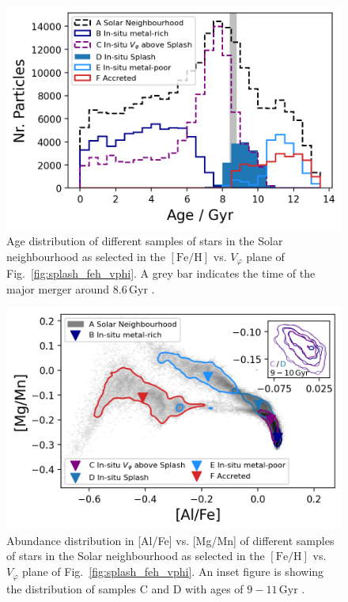 \documentclass[fleqn,usenatbib]{mnras}
\begin{document}
\begin{figure}
    \centering
    \includegraphics[width=0.9\columnwidth]{figures/splash_age.png}
    \caption{Age distribution of different samples of stars in the Solar neighbourhood as selected in the $\mathrm{[Fe/H]}$ vs. $V_\varphi$ plane of Fig.~\ref{fig:splash_feh_vphi}. A grey bar indicates the time of the major merger around $8.6\,\mathrm{Gyr}$ \href{https://github.com/svenbuder/gse_nihaouhd/tree/main/figures}{\faGithub}.}
    \label{fig:splash_age}
\end{figure}

\begin{figure}
    \centering
    \includegraphics[width=0.9\columnwidth]{figures/splash_alfe_mgmn.png}
    \caption{Abundance distribution in [Al/Fe] vs. [Mg/Mn] of different samples of stars in the Solar neighbourhood as selected in the $\mathrm{[Fe/H]}$ vs. $V_\varphi$ plane of Fig.~\ref{fig:splash_feh_vphi}. An inset figure is showing the distribution of samples C and D with ages of $9-11\,\mathrm{Gyr}$ \href{https://github.com/svenbuder/gse_nihaouhd/tree/main/figures}{\faGithub}.}
    \label{fig:splash_alfe_mgmn}
\end{figure}
\end{document}
